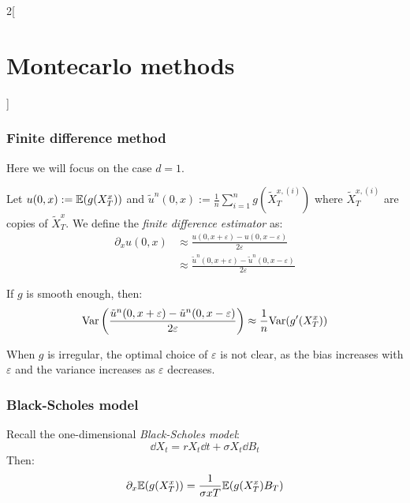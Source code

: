 \documentclass[../../../main_math.tex]{subfiles}
\begin{document}
\begin{multicols}{2}[\section{Montecarlo methods}]
  \subsubsection{Finite difference method}
  Here we will focus on the case $d=1$.
  \begin{definition}
    Let $u(0,x):=\mathbb{E}(g(X_T^x))$ and $\tilde{u}^n(0,x):=\frac{1}{n}\sum_{i=1}^n g(\tilde{X}_T^{x,(i)})$ where $\tilde{X}_T^{x,(i)}$ are \iid copies of $\tilde{X}_T^x$. We define the \emph{finite difference estimator} as:
    \begin{align*}
      \partial_xu(0,x) & \approx \frac{u(0,x+\varepsilon) - u(0,x-\varepsilon)}{2\varepsilon}                     \\
                       & \approx \frac{\tilde{u}^n(0,x+\varepsilon) - \tilde{u}^n(0,x-\varepsilon)}{2\varepsilon}
    \end{align*}
  \end{definition}
  \begin{proposition}
    If $g$ is smooth enough, then:
    $$
      \mathrm{Var}\left( \frac{\tilde{u}^n(0,x+\varepsilon) - \tilde{u}^n(0,x-\varepsilon)}{2\varepsilon}\right)\approx \frac{1}{n}\mathrm{Var}(g'(X_T^x))
    $$
  \end{proposition}
  \begin{remark}
    When $g$ is irregular, the optimal choice of $\varepsilon$ is not clear, as the bias increases with $\varepsilon$ and the variance increases as $\varepsilon$ decreases.
  \end{remark}
  \subsubsection{Black-Scholes model}
  \begin{proposition}
    Recall the one-dimensional \emph{Black-Scholes model}:
    $$
      \dd{X}_t=r X_t\dd{t}+\sigma X_t\dd{B}_t
    $$
    Then: $$
      \partial_x \mathbb{E}(g(X_T^x))=\frac{1}{\sigma x T}\mathbb{E}(g(X_T^x)B_T)
    $$
  \end{proposition}

\end{multicols}
\end{document}
